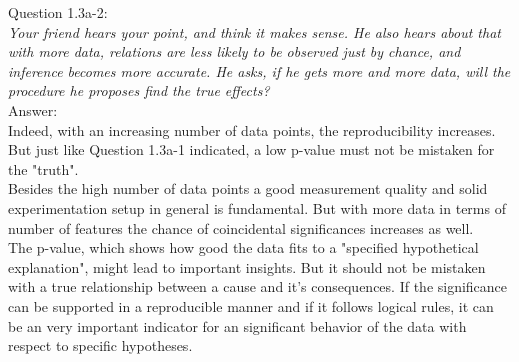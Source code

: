 
Question 1.3a-2:\\	
\textsl{Your friend hears your point, and think it makes sense. He also hears about that with more data, relations are less likely to be observed just by chance, and inference becomes more accurate. He asks, if he gets more and more data, will the procedure he proposes find the true effects?}\\

Answer:\\
Indeed, with an increasing number of data points, the reproducibility increases. But just like Question 1.3a-1 indicated, a low p-value must not be mistaken for the "truth".\\

Besides the high number of data points a good measurement quality and solid experimentation setup in general is fundamental. But with more data in terms of number of features the chance of coincidental significances increases as well.\\

The p-value, which shows how good the data fits to a "specified hypothetical explanation", might lead to important insights. But it should not be mistaken with a true relationship between a cause and it's consequences. If the significance can be supported in a reproducible manner and if it follows logical rules, it can be an very important indicator for an significant behavior of the data with respect to specific hypotheses.\\





